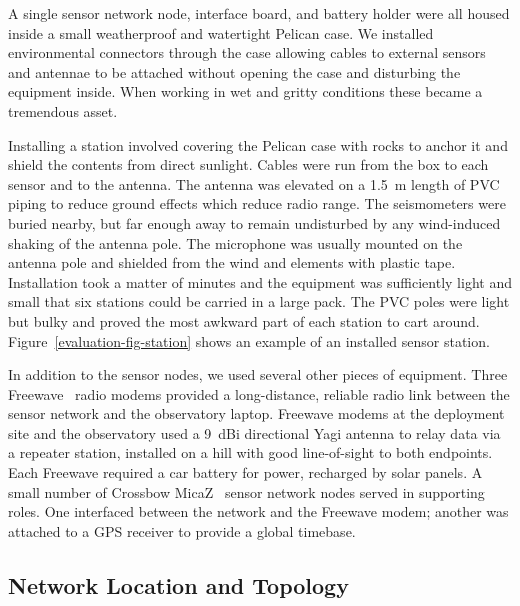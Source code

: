 A single sensor network node, interface board, and battery holder were all
housed inside a small weatherproof and watertight Pelican case. We installed
environmental connectors through the case allowing cables to external sensors
and antennae to be attached without opening the case and disturbing the
equipment inside. When working in wet and gritty conditions these became a
tremendous asset.

Installing a station involved covering the Pelican case with rocks to anchor
it and shield the contents from direct sunlight. Cables were run from the box
to each sensor and to the antenna. The antenna was elevated on a 1.5~m length
of PVC piping to reduce ground effects which reduce radio range. The
seismometers were buried nearby, but far enough away to remain undisturbed by
any wind-induced shaking of the antenna pole. The microphone was usually
mounted on the antenna pole and shielded from the wind and elements with
plastic tape. Installation took a matter of minutes and the equipment was
sufficiently light and small that six stations could be carried in a large
pack. The PVC poles were light but bulky and proved the most awkward part of
each station to cart around. Figure~\ref{evaluation-fig-station} shows an
example of an installed sensor station.

In addition to the sensor nodes, we used several other pieces of equipment.
Three Freewave~\cite{freewave} radio modems provided a long-distance,
reliable radio link between the sensor network and the observatory laptop.
Freewave modems at the deployment site and the observatory used a 9~dBi
directional Yagi antenna to relay data via a repeater station, installed on a
hill with good line-of-sight to both endpoints. Each Freewave required a car
battery for power, recharged by solar panels. A small number of Crossbow
MicaZ~\cite{micaz} sensor network nodes served in supporting roles. One
interfaced between the network and the Freewave modem; another was attached
to a GPS receiver to provide a global timebase.

\subsection{Network Location and Topology}

